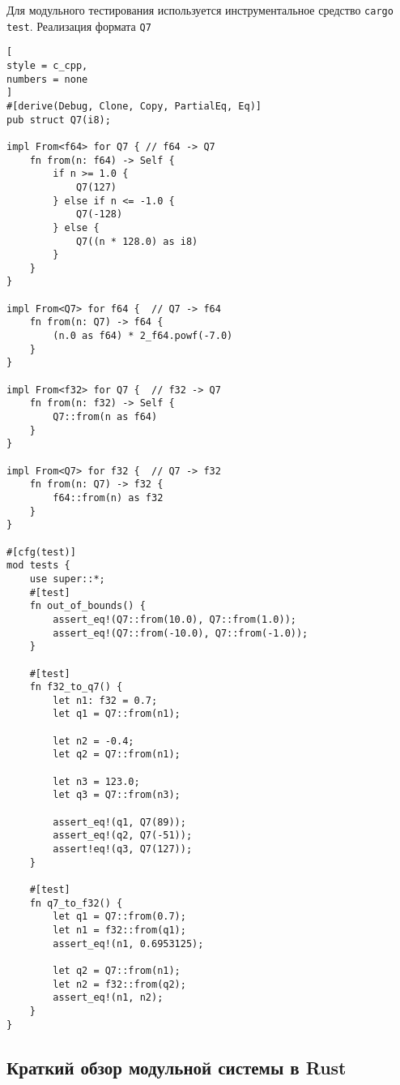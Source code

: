\documentclass[%
	11pt,
	a4paper,
	utf8,
		]{article}
\begin{document}
Для модульного тестирования используется инструментальное средство \verb|cargo test|. Реализация формата \verb|Q7|
\begin{lstlisting}[
style = c_cpp,
numbers = none
]
#[derive(Debug, Clone, Copy, PartialEq, Eq)]
pub struct Q7(i8);

impl From<f64> for Q7 { // f64 -> Q7
    fn from(n: f64) -> Self {
        if n >= 1.0 {
            Q7(127)
        } else if n <= -1.0 {
            Q7(-128)
        } else {
            Q7((n * 128.0) as i8)
        }
    }
}

impl From<Q7> for f64 {  // Q7 -> f64
    fn from(n: Q7) -> f64 {
        (n.0 as f64) * 2_f64.powf(-7.0)
    }
}

impl From<f32> for Q7 {  // f32 -> Q7
    fn from(n: f32) -> Self {
        Q7::from(n as f64)
    }
}

impl From<Q7> for f32 {  // Q7 -> f32
    fn from(n: Q7) -> f32 {
        f64::from(n) as f32
    }
}

#[cfg(test)]
mod tests {
    use super::*;
    #[test]
    fn out_of_bounds() {
        assert_eq!(Q7::from(10.0), Q7::from(1.0));
        assert_eq!(Q7::from(-10.0), Q7::from(-1.0));
    }

    #[test]
    fn f32_to_q7() {
        let n1: f32 = 0.7;
        let q1 = Q7::from(n1);
        
        let n2 = -0.4;
        let q2 = Q7::from(n1);
        
        let n3 = 123.0;
        let q3 = Q7::from(n3);
        
        assert_eq!(q1, Q7(89));
        assert_eq!(q2, Q7(-51));
        assert!eq!(q3, Q7(127));
    }

    #[test]
    fn q7_to_f32() {
        let q1 = Q7::from(0.7);
        let n1 = f32::from(q1);
        assert_eq!(n1, 0.6953125);
        
        let q2 = Q7::from(n1);
        let n2 = f32::from(q2);
        assert_eq!(n1, n2);
    }
}
\end{lstlisting}

\subsection{Краткий обзор модульной системы в Rust}
\end{document}
